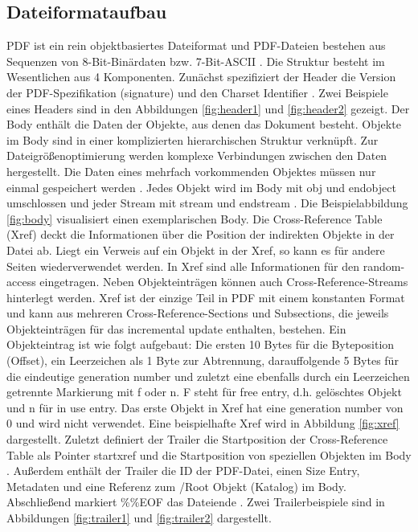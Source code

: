 \subsection{Dateiformataufbau}
PDF ist ein rein objektbasiertes Dateiformat und PDF-Dateien bestehen aus Sequenzen von 8-Bit-Binärdaten bzw. 7-Bit-ASCII \cite{schneeberger}. Die Struktur besteht im Wesentlichen aus 4 Komponenten. Zunächst spezifiziert der Header die Version der PDF-Spezifikation (signature) und den Charset Identifier \cite{ccc-pdf-secrets}. Zwei Beispiele eines Headers sind in den Abbildungen \ref{fig:header1} und \ref{fig:header2} gezeigt. Der Body enthält die Daten der Objekte, aus denen das Dokument besteht. Objekte im Body sind in einer komplizierten hierarchischen Struktur verknüpft. Zur Dateigrößenoptimierung werden komplexe Verbindungen zwischen den Daten hergestellt. Die Daten eines mehrfach vorkommenden Objektes müssen nur einmal gespeichert werden \cite{softx}. Jedes Objekt wird im Body mit obj und endobject umschlossen und jeder Stream mit stream und endstream \cite{schneeberger}. Die Beispielabbildung \ref{fig:body} visualisiert einen exemplarischen Body. Die Cross-Reference Table (Xref) deckt die Informationen über die Position der indirekten Objekte in der Datei ab. Liegt ein Verweis auf ein Objekt in der Xref, so kann es für andere Seiten wiederverwendet werden. In Xref sind alle Informationen für den random-access eingetragen. Neben Objekteinträgen können auch Cross-Reference-Streams hinterlegt werden. Xref ist der einzige Teil in PDF mit einem konstanten Format und kann aus mehreren Cross-Reference-Sections und Subsections, die jeweils Objekteinträgen für das incremental update enthalten, bestehen. Ein Objekteintrag ist wie folgt aufgebaut: Die ersten 10 Bytes für die Byteposition (Offset), ein Leerzeichen als 1 Byte zur Abtrennung, darauffolgende 5 Bytes für die eindeutige generation number und zuletzt eine ebenfalls durch ein Leerzeichen getrennte Markierung mit f oder n. F steht für free entry, d.h. gelöschtes Objekt und n für in use entry. Das erste Objekt in Xref hat eine generation number von 0 und wird nicht verwendet. Eine beispielhafte Xref wird in Abbildung \ref{fig:xref} dargestellt. Zuletzt definiert der Trailer die Startposition der Cross-Reference Table als Pointer startxref und die Startposition von speziellen Objekten im Body \cite{ccc-break-pdf}.  Außerdem enthält der Trailer die ID der PDF-Datei, einen Size Entry, Metadaten und eine Referenz zum /Root Objekt (Katalog) im Body. Abschließend markiert \%\%EOF das Dateiende \cite{ccc-break-pdf, ccc-pdf-secrets}. Zwei Trailerbeispiele sind in Abbildungen \ref{fig:trailer1} und \ref{fig:trailer2} dargestellt.

